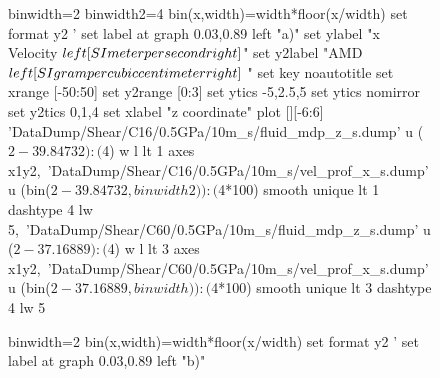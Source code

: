 \documentclass[5p]{elsarticle}
\begin{document}





\begin{figure}[htp]
    	\begin{center}
		\begin{gnuplot}[terminal=epslatex, terminaloptions={size \SERFigwidth cm, \SERFigheight cm color solid}]
			binwidth=2
			binwidth2=4
			bin(x,width)=width*floor(x/width)
			set format y2 '%
			set label at graph 0.03,0.89 left "a)"
			set ylabel "x Velocity $\\left[ \\SI{}{\\meter\\per\\second} \\right]$"
			set y2label "AMD $\\left[ \\SI{}{\\gram\\per\\cubic\\centi\\meter} \\right]$ "
			set key noautotitle
			set xrange [-50:50]
			set y2range [0:3]
			set ytics  -5,2.5,5
			set ytics nomirror
			set y2tics 0,1,4
			set xlabel "z coordinate"  
			plot  	[][-6:6]  'DataDump/Shear/C16/0.5GPa/10m_s/fluid_mdp_z_s.dump' u ($2-39.84732):($4) w l  lt 1 axes x1y2,\    								
				              'DataDump/Shear/C16/0.5GPa/10m_s/vel_prof_x_s.dump'  u (bin($2-39.84732,binwidth2)):($4*100) smooth unique lt 1 dashtype 4 lw 5,\	
                             		     'DataDump/Shear/C60/0.5GPa/10m_s/fluid_mdp_z_s.dump' u ($2-37.16889):($4) w l  lt 3  axes x1y2,\ 								
				              'DataDump/Shear/C60/0.5GPa/10m_s/vel_prof_x_s.dump'  u (bin($2-37.16889,binwidth)):($4*100) smooth unique lt 3 dashtype 4 lw 5	
		\end{gnuplot}
		\begin{gnuplot}[terminal=epslatex, terminaloptions={size \SERFigwidth cm, \SERFigheight cm color solid}]
			binwidth=2
			bin(x,width)=width*floor(x/width)
			set format y2 '%
			set label at graph 0.03,0.89 left "b)"

\end{gnuplot}
\end{center}
\end{figure}
\end{document}
